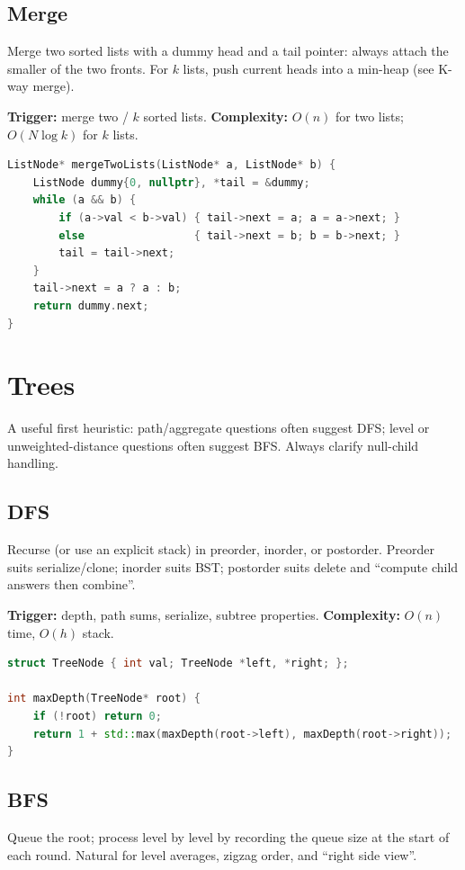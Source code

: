 \subsection{Merge}
\label{subsec:pat-ll-merge}
Merge two sorted lists with a dummy head and a tail pointer: always attach the
smaller of the two fronts. For $k$ lists, push current heads into a min-heap
(see K-way merge).

\textbf{Trigger:} merge two / $k$ sorted lists.
\newline
\textbf{Complexity:} $O(n)$ for two lists; $O(N\log k)$ for $k$ lists.

\begin{lstlisting}[language=C++]
ListNode* mergeTwoLists(ListNode* a, ListNode* b) {
    ListNode dummy{0, nullptr}, *tail = &dummy;
    while (a && b) {
        if (a->val < b->val) { tail->next = a; a = a->next; }
        else                 { tail->next = b; b = b->next; }
        tail = tail->next;
    }
    tail->next = a ? a : b;
    return dummy.next;
}
\end{lstlisting}

\section{Trees}
\label{sec:pat-trees}
A useful first heuristic: path/aggregate questions often suggest DFS;
level or unweighted-distance questions often suggest BFS. Always clarify
null-child handling.

\subsection{DFS}
\label{subsec:pat-tree-dfs}
Recurse (or use an explicit stack) in preorder, inorder, or postorder.
Preorder suits serialize/clone; inorder suits BST; postorder suits delete and
``compute child answers then combine''.

\textbf{Trigger:} depth, path sums, serialize, subtree properties.
\newline
\textbf{Complexity:} $O(n)$ time, $O(h)$ stack.

\begin{lstlisting}[language=C++]
struct TreeNode { int val; TreeNode *left, *right; };

int maxDepth(TreeNode* root) {
    if (!root) return 0;
    return 1 + std::max(maxDepth(root->left), maxDepth(root->right));
}
\end{lstlisting}

\subsection{BFS}
\label{subsec:pat-tree-bfs}
Queue the root; process level by level by recording the queue size at the start
of each round. Natural for level averages, zigzag order, and ``right side view''.

